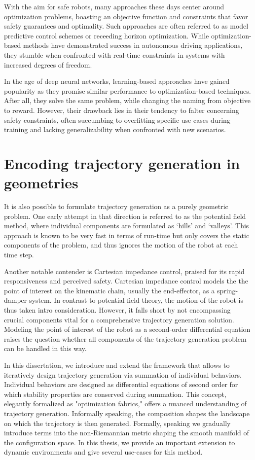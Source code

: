 With the aim for safe robots, many approaches these days
center around optimization problems, boasting an objective
function and constraints that favor safety guarantees and
optimality. Such approaches are often referred to as model
predictive control schemes or receeding horizon
optimization. While optimization-based methods have
demonstrated success in autonomous driving applications,
they stumble when confronted with real-time constraints in
systems with increased degrees of freedom.

In the age of deep neural networks, learning-based approaches have gained
popularity as they promise similar performance to
optimization-based techniques. After all, they solve the
same problem, while changing the naming from objective to
reward. However, their drawback lies in their tendency to falter concerning
safety constraints, often succumbing to overfitting specific use cases during
training and lacking generalizability when confronted with new scenarios.

\section{Encoding trajectory generation in geometries}

It is also possible to formulate trajectory generation as a
purely geometric problem. One early attempt in that
direction is referred to as the potential field method,
where individual components are formulated as `hills' and
`valleys'. This approach is known to be very fast in terms
of run-time but only covers the static components of the
problem, and thus ignores the motion of the robot at each
time step.

Another notable contender is Cartesian
impedance control, praised for its rapid responsiveness and
perceived safety.
Cartesian impedance control models the the point of interest
on the kinematic chain, usually the end-effector, as a
spring-damper-system. In contrast to potential field theory,
the motion of the robot is thus taken intro consideration.
However, it falls short by not encompassing crucial
components vital for a comprehensive trajectory generation
solution. Modeling the point of interest of the robot as a
second-order differential equation raises the question
whether all components of the trajectory generation problem
can be handled in this way. 


In this dissertation, we introduce and extend the framework
that allows to iteratively design trajectory generation via
summation of individual behaviors. Individual behaviors are
designed as differential equations of second order for which
stability properties are conserved during summation.
This concept, elegantly formalized as "optimization
fabrics," offers a nuanced understanding of trajectory
generation. Informally speaking, the composition shapes the
landscape on which the trajectory is then generated.
Formally, speaking we gradually introduce terms into the
non-Riemannian metric shaping the smooth manifold of the
configuration space. In this thesis, we provide an important
extension to dynamic environments and give several use-cases
for this method.


